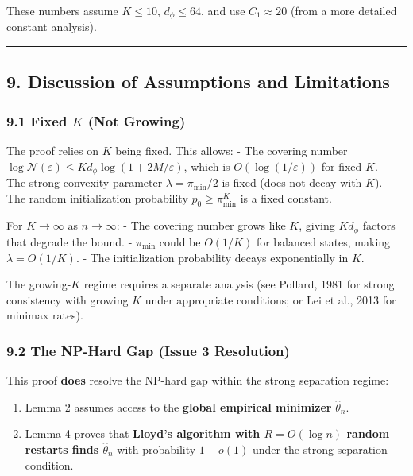 \documentclass[
  12pt,
]{ctexart}
\providecommand{\tightlist}{%
  \setlength{\itemsep}{0pt}\setlength{\parskip}{0pt}}
\begin{document}
These numbers assume \(K \leq 10\), \(d_\phi \leq 64\), and use
\(C_1 \approx 20\) (from a more detailed constant analysis).

\begin{center}\rule{0.5\linewidth}{0.5pt}\end{center}

\subsection{9. Discussion of Assumptions and
Limitations}\label{discussion-of-assumptions-and-limitations}

\subsubsection{\texorpdfstring{9.1 Fixed \(K\) (Not
Growing)}{9.1 Fixed K (Not Growing)}}\label{fixed-k-not-growing}

The proof relies on \(K\) being fixed. This allows: - The covering
number
\(\log \mathcal{N}(\varepsilon) \leq K d_\phi \log(1 + 2M/\varepsilon)\),
which is \(O(\log(1/\varepsilon))\) for fixed \(K\). - The strong
convexity parameter \(\lambda = \pi_{\min}/2\) is fixed (does not decay
with \(K\)). - The random initialization probability
\(p_0 \geq \pi_{\min}^K\) is a fixed constant.

For \(K \to \infty\) as \(n \to \infty\): - The covering number grows
like \(K\), giving \(K d_\phi\) factors that degrade the bound. -
\(\pi_{\min}\) could be \(O(1/K)\) for balanced states, making
\(\lambda = O(1/K)\). - The initialization probability decays
exponentially in \(K\).

The growing-\(K\) regime requires a separate analysis (see Pollard, 1981
for strong consistency with growing \(K\) under appropriate conditions;
or Lei et al., 2013 for minimax rates).

\subsubsection{9.2 The NP-Hard Gap (Issue 3
Resolution)}\label{the-np-hard-gap-issue-3-resolution}

This proof \textbf{does} resolve the NP-hard gap within the strong
separation regime:

\begin{enumerate}
\def\labelenumi{\arabic{enumi}.}
\tightlist
\item
  Lemma 2 assumes access to the \textbf{global empirical minimizer}
  \(\hat{\theta}_n\).
\item
  Lemma 4 proves that \textbf{Lloyd's algorithm with \(R = O(\log n)\)
  random restarts finds \(\hat{\theta}_n\)} with probability
  \(1 - o(1)\) under the strong separation condition.
\end{enumerate}
\end{document}
